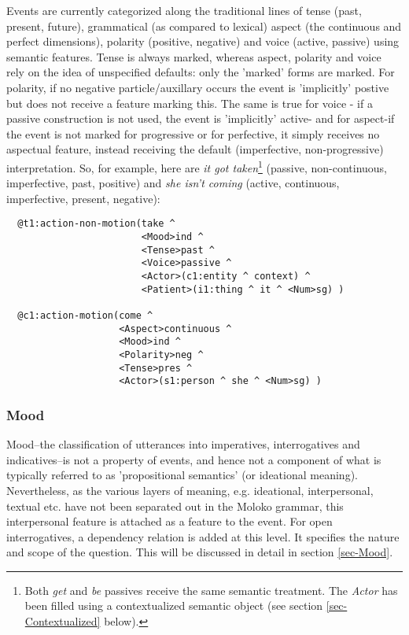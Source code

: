Events are currently categorized along the traditional lines of tense (past, present, future), grammatical (as compared to lexical) aspect (the continuous and perfect dimensions), polarity (positive, negative) and voice (active, passive) using semantic features. Tense is always marked, whereas aspect, polarity and voice rely on the idea of unspecified defaults: only the 'marked' forms are marked. For polarity, if no negative particle/auxillary occurs the event is 'implicitly' postive but does not receive a feature marking this. The same is true for voice - if a passive construction is not used, the event is 'implicitly' active- and for aspect-if the event is not marked for progressive or for perfective, it simply receives no aspectual feature, instead receiving the default (imperfective, non-progressive) interpretation. So, for example, here are \emph{it got taken}\footnote{ Both \emph{get} and \emph{be} passives receive the same semantic treatment. The \emph{Actor} has been filled using a contextualized semantic object (see section \ref{sec-Contextualized} below).} (passive, non-continuous, imperfective, past, positive) and \emph{she isn't coming} (active, continuous, imperfective, present, negative):
\begin{verbatim}
  @t1:action-non-motion(take ^ 
                        <Mood>ind ^ 
                        <Tense>past ^ 
                        <Voice>passive ^ 
                        <Actor>(c1:entity ^ context) ^ 
                        <Patient>(i1:thing ^ it ^ <Num>sg) )

  @c1:action-motion(come ^ 
                    <Aspect>continuous ^ 
                    <Mood>ind ^ 
                    <Polarity>neg ^ 
                    <Tense>pres ^ 
                    <Actor>(s1:person ^ she ^ <Num>sg) ) 
\end{verbatim}                    
                    
\subsubsection{Mood}

Mood--the classification of utterances into imperatives, interrogatives and indicatives--is not a property of events, and hence not a component of what is typically referred to as 'propositional semantics' (or ideational meaning). Nevertheless, as the various layers of meaning, e.g. ideational, interpersonal, textual etc. have not been separated out in the Moloko grammar, this interpersonal feature is attached as a feature to the event. For open interrogatives, a dependency relation  is added at this level. It specifies the nature and scope of the question.  This will be discussed in detail in section \ref{sec-Mood}.

